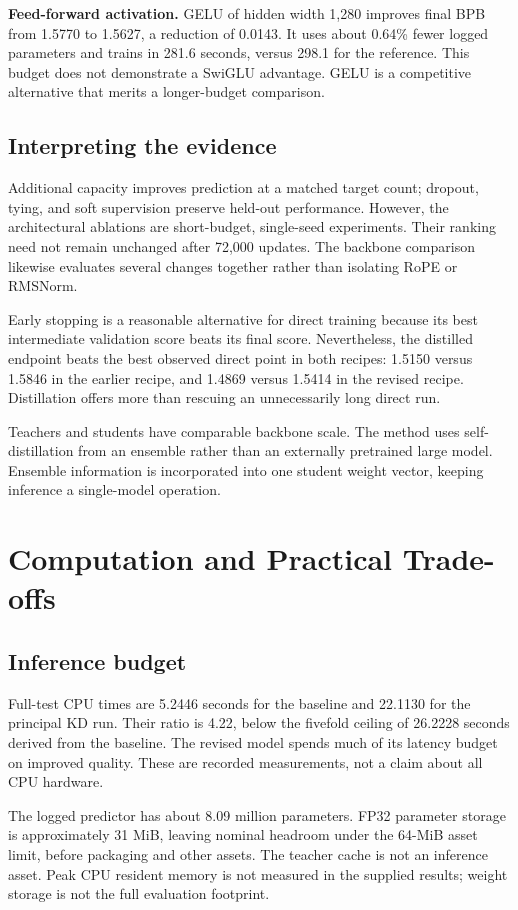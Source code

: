 \documentclass[10pt,twocolumn,letterpaper]{article}
\newcommand{\plainpara}[1]{\noindent\textbf{#1}\quad}
\begin{document}
\plainpara{Feed-forward activation.}
GELU of hidden width 1,280 improves final BPB from 1.5770 to 1.5627,
a reduction of 0.0143. It uses about 0.64\% fewer logged parameters and
trains in 281.6 seconds, versus 298.1 for the reference. This budget does
not demonstrate a SwiGLU advantage. GELU is a competitive alternative
that merits a longer-budget comparison.

\subsection{Interpreting the evidence}
Additional capacity improves prediction at a matched target count;
dropout, tying, and soft supervision preserve held-out performance.
However, the architectural ablations are short-budget, single-seed
experiments. Their ranking need not remain unchanged after 72,000 updates.
The backbone comparison likewise evaluates several changes together
rather than isolating RoPE or RMSNorm.

Early stopping is a reasonable alternative for direct training because
its best intermediate validation score beats its final score. Nevertheless,
the distilled endpoint beats the best observed direct point in both
recipes: 1.5150 versus 1.5846 in the earlier recipe, and 1.4869 versus
1.5414 in the revised recipe. Distillation offers more than rescuing an
unnecessarily long direct run.

Teachers and students have comparable backbone scale. The method uses
self-distillation from an ensemble rather than an externally pretrained
large model. Ensemble information is incorporated into one student
weight vector, keeping inference a single-model operation.

\section{Computation and Practical Trade-offs}
\subsection{Inference budget}
Full-test CPU times are 5.2446 seconds for the baseline and 22.1130 for
the principal KD run. Their ratio is 4.22, below the fivefold ceiling of
26.2228 seconds derived from the baseline. The revised model spends much
of its latency budget on improved quality. These are recorded measurements,
not a claim about all CPU hardware.

The logged predictor has about 8.09 million parameters. FP32 parameter
storage is approximately 31 MiB, leaving nominal headroom under the
64-MiB asset limit, before packaging and other assets. The teacher cache
is not an inference asset. Peak CPU resident memory is not measured in
the supplied results; weight storage is not the full evaluation footprint.
\end{document}
